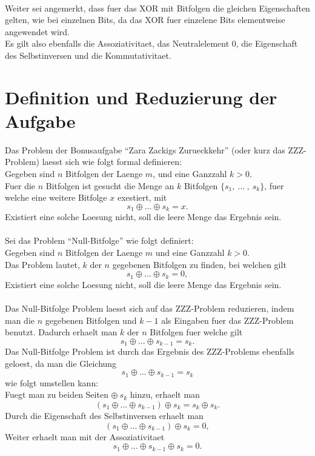 \documentclass[a4paper,10pt,ngerman]{scrartcl}
\begin{document}
\\Weiter sei angemerkt, dass fuer das XOR mit Bitfolgen die gleichen Eigenschaften gelten, wie bei einzelnen Bits, da das XOR fuer einzelene Bits elementweise angewendet wird.\\
Es gilt also ebenfalls die Assoziativitaet, das Neutralelement $0$, die Eigenschaft des Selbstinversen und die Kommutativitaet.


\section{Definition und Reduzierung der Aufgabe}
Das Problem der Bonusaufgabe "`Zara Zackigs Zurueckkehr"' (oder kurz das ZZZ-Problem) laesst sich wie folgt formal definieren:\\
Gegeben sind \(n\) Bitfolgen der Laenge \(m\), und eine Ganzzahl $k > 0$.\\
Fuer die \(n\) Bitfolgen ist gesucht die Menge an \(k\) Bitfolgen \( \{ s_1, \ \dots \ , \ s_k \} \), fuer welche eine weitere Bitfolge \(x\) exestiert, mit
\[s_1 \oplus \dots \oplus s_k = x. \]
Existiert eine solche Loesung nicht, soll die leere Menge das Ergebnis sein.
\\\\
Sei das Problem "`Null-Bitfolge"' wie folgt definiert:\\
Gegeben sind \(n\) Bitfolgen der Laenge $m$ und eine Ganzzahl $k > 0$.\\
Das Problem lautet, \(k\) der \(n\) gegebenen Bitfolgen zu finden, bei welchen gilt
\[s_1 \oplus \dots \oplus s_k = 0, \] 
Existiert eine solche Loesung nicht, soll die leere Menge das Ergebnis sein.
\\\\
Das Null-Bitfolge Problem laesst sich auf das ZZZ-Problem reduzieren, indem man die $n$ gegebenen Bitfolgen und $k-1$ als Eingaben fuer das ZZZ-Problem benutzt.
Dadurch erhaelt man $k$ der $n$ Bitfolgen fuer welche gilt
\[s_1 \oplus \dots \oplus s_{k-1} = s_k. \] 
Das Null-Bitfolge Problem ist durch das Ergebnis des ZZZ-Problems ebenfalls geloest, da man die Gleichung 
\[s_1 \oplus \dots \oplus s_{k-1} = s_k \]  
wie folgt umstellen kann:\\
Fuegt man zu beiden Seiten \(\oplus \ s_k \) hinzu, erhaelt man
\[(s_1 \oplus \dots \oplus s_{k-1}) \oplus s_k = s_k \oplus s_k . \] 
Durch die Eigenschaft des Selbstinversen erhaelt man
\[(s_1 \oplus \dots \oplus s_{k-1}) \oplus s_k = 0,  \] 
Weiter erhaelt man mit der Assoziativitaet
\[s_1 \oplus \dots \oplus s_{k-1} \oplus s_k = 0 . \] 
\end{document}
